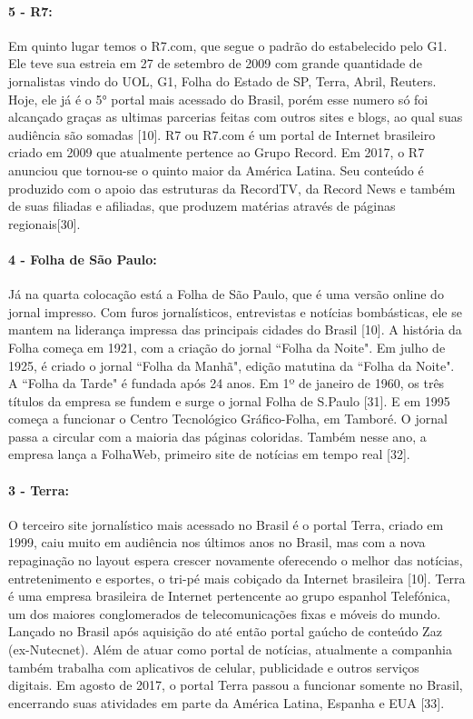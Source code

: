 \documentclass[a4paper]{article}
\begin{document}
\begin{titlepage}
\paragraph{5 - R7: }

Em quinto lugar temos o R7.com, que segue o padrão do estabelecido pelo G1. Ele teve sua estreia em 27 de setembro de 2009 com grande quantidade de jornalistas vindo do UOL, G1, Folha do Estado de SP, Terra, Abril, Reuters. Hoje, ele já é o 5° portal mais acessado do Brasil, porém esse numero só foi alcançado graças as ultimas parcerias feitas com outros sites e blogs, ao qual suas audiência são somadas [10]. R7 ou R7.com é um portal de Internet brasileiro criado em 2009 que atualmente pertence ao Grupo Record. Em 2017, o R7 anunciou que tornou-se o quinto maior da América Latina. Seu conteúdo é produzido com o apoio das estruturas da RecordTV, da Record News e também de suas filiadas e afiliadas, que produzem matérias através de páginas regionais[30].

\paragraph{4 - Folha de São Paulo: }

Já na quarta colocação está a Folha de São Paulo, que é uma versão online do jornal impresso. Com furos jornalísticos, entrevistas e notícias bombásticas, ele se mantem na liderança impressa das principais cidades do Brasil [10]. A história da Folha começa em 1921, com a criação do jornal ``Folha da Noite". Em julho de 1925, é criado o jornal ``Folha da Manhã", edição matutina da ``Folha da Noite". A ``Folha da Tarde" é fundada após 24 anos. Em 1º de janeiro de 1960, os três títulos da empresa se fundem e surge o jornal Folha de S.Paulo [31]. E em 1995 começa a funcionar o Centro Tecnológico Gráfico-Folha, em Tamboré. O jornal passa a circular com a maioria das páginas coloridas. Também nesse ano, a empresa lança a FolhaWeb, primeiro site de notícias em tempo real [32].

\paragraph{3 - Terra: }

O terceiro site jornalístico mais acessado no Brasil é o portal Terra, criado em 1999, caiu muito em audiência nos últimos anos no Brasil, mas com a nova repaginação no layout espera crescer novamente oferecendo o melhor das notícias, entretenimento e esportes, o tri-pé mais cobiçado da Internet brasileira [10]. Terra é uma empresa brasileira de Internet pertencente ao grupo espanhol Telefónica, um dos maiores conglomerados de telecomunicações fixas e móveis do mundo. Lançado no Brasil após aquisição do até então portal gaúcho de conteúdo Zaz (ex-Nutecnet). Além de atuar como portal de notícias, atualmente a companhia também trabalha com aplicativos de celular, publicidade e outros serviços digitais. Em agosto de 2017, o portal Terra passou a funcionar somente no Brasil, encerrando suas atividades em parte da América Latina, Espanha e EUA [33].


\end{titlepage}
\end{document}

